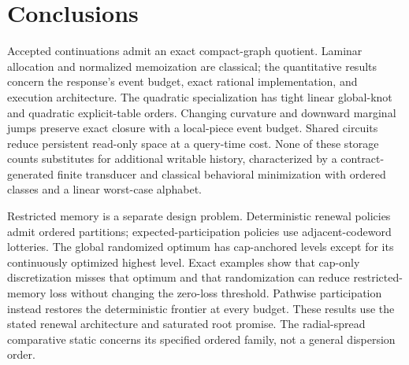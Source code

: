 \documentclass[11pt,letterpaper]{article}
\theoremstyle{definition}\newtheorem{assumption}[theorem]{Assumption}
\begin{document}
\hypersetup{pageanchor=true}















\section{Conclusions}\label{sec:conclusion}
Accepted continuations admit an exact compact-graph quotient. Laminar allocation and normalized memoization are classical; the quantitative results concern the response's event budget, exact rational implementation, and execution architecture. The quadratic specialization has tight linear global-knot and quadratic explicit-table orders. Changing curvature and downward marginal jumps preserve exact closure with a local-piece event budget. Shared circuits reduce persistent read-only space at a query-time cost. None of these storage counts substitutes for additional writable history, characterized by a contract-generated finite transducer and classical behavioral minimization with ordered classes and a linear worst-case alphabet.

Restricted memory is a separate design problem. Deterministic renewal policies admit ordered partitions; expected-participation policies use adjacent-codeword lotteries. The global randomized optimum has cap-anchored levels except for its continuously optimized highest level. Exact examples show that cap-only discretization misses that optimum and that randomization can reduce restricted-memory loss without changing the zero-loss threshold. Pathwise participation instead restores the deterministic frontier at every budget. These results use the stated renewal architecture and saturated root promise. The radial-spread comparative static concerns its specified ordered family, not a general dispersion order.
\end{document}
